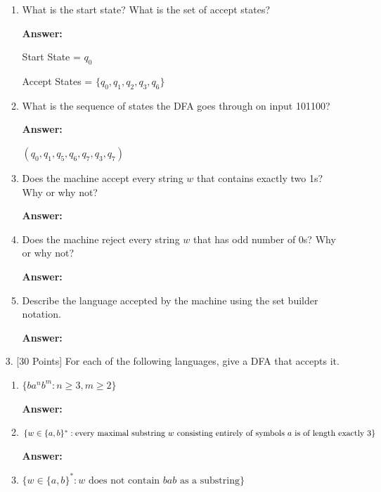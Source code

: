 \documentclass[12pt]{article}
\begin{document}
\begin{enumerate}
	      \begin{enumerate}
		      \item What is the start state? What is the set of accept states?

		            \noindent \textbf{Answer:}

		            Start State = $q_0$

		            Accept States = $\{q_0, q_1, q_2, q_3, q_6\}$

		      \item What is the sequence of states the DFA goes through on input 101100?

		            \noindent \textbf{Answer:}

		            $(q_0, q_1, q_5, q_6, q_7, q_3, q_7)$

		      \item Does the machine accept every string $w$ that contains exactly two 1s? Why or why not?

		            \noindent \textbf{Answer:}

		      \item Does the machine reject every string $w$ that has odd number of 0s? Why or why not?

		            \noindent \textbf{Answer:}

		      \item Describe the language accepted by the machine using the set builder notation.

		            \noindent \textbf{Answer:}

	      \end{enumerate}

	      \newpage

	\item[3.] [30 Points] For each of the following languages, give a DFA that accepts it.

	      \begin{enumerate}
		      \item $\{ba^nb^m : n \geq 3, m \geq 2 \}$

		            \noindent \textbf{Answer:}

		      \item $\{w \in \{a,b \}^* : \text{every maximal substring } w \text{ consisting entirely of symbols } a \\ \text{ is of length exactly 3} \}$

		            \noindent \textbf{Answer:}

		      \item $\{w \in \{a,b \}^* : \text{$w$ does not contain $bab$ as a substring} \}$


\end{enumerate}
\end{enumerate}
\end{document}
